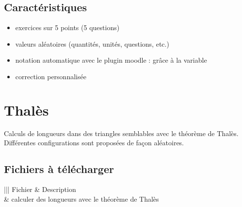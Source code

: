 \documentclass[letterpaper,10pt,french]{sphinxmanual}
\begin{document}
\subsection{Caractéristiques}
\label{\detokenize{geom-pythagore:caracteristiques}}\begin{itemize}
\item {} 
exercices sur 5 points (5 questions)

\item {} 
valeurs aléatoires (quantités, unités, questions, etc.)

\item {} 
notation automatique avec le plugin moodle : grâce à la variable 

\item {} 
correction personnalisée

\end{itemize}


\section{Thalès}
\label{\detokenize{geom-thales:thales}}\label{\detokenize{geom-thales::doc}}
Calculs de longueurs dans des triangles semblables avec le théorème de Thalès.
Différentes configurations sont proposées de façon aléatoires.



\subsection{Fichiers à télécharger}
\label{\detokenize{geom-thales:fichiers-a-telecharger}}

\begin{savenotes}\sphinxattablestart
\centering
{}
\label{\detokenize{geom-thales:id1}}
\sphinxaftercaption
\begin{tabular}[t]{|||}
\hline
\sphinxstyletheadfamily 
Fichier
&\sphinxstyletheadfamily 
Description
\\
\hline
{}
&
calculer des longueurs avec le théorème de Thalès
\\
\hline
\end{tabular}
\par
\sphinxattableend\end{savenotes}
\end{document}

